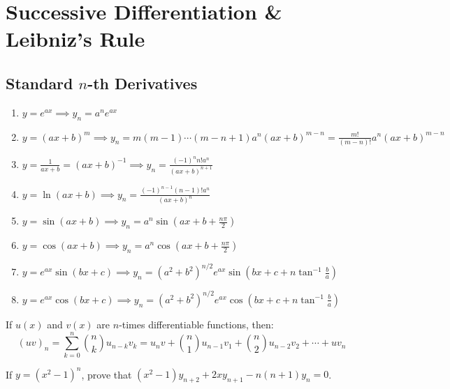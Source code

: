 \section{Successive Differentiation \& Leibniz's Rule}

\subsection{Standard $n$-th Derivatives}
\begin{enumerate}[leftmargin=1.5em]
    \item $y = e^{ax} \implies y_n = a^n e^{ax}$
    \item $y = (ax+b)^m \implies y_n = m(m-1)\cdots(m-n+1) a^n (ax+b)^{m-n} = \frac{m!}{(m-n)!} a^n (ax+b)^{m-n}$
    \item $y = \frac{1}{ax+b} = (ax+b)^{-1} \implies y_n = \frac{(-1)^n n! a^n}{(ax+b)^{n+1}}$
    \item $y = \ln(ax+b) \implies y_n = \frac{(-1)^{n-1} (n-1)! a^n}{(ax+b)^n}$
    \item $y = \sin(ax+b) \implies y_n = a^n \sin\left(ax+b + \frac{n\pi}{2}\right)$
    \item $y = \cos(ax+b) \implies y_n = a^n \cos\left(ax+b + \frac{n\pi}{2}\right)$
    \item $y = e^{ax} \sin(bx+c) \implies y_n = (a^2+b^2)^{n/2} e^{ax} \sin\left(bx+c + n\tan^{-1}\frac{b}{a}\right)$
    \item $y = e^{ax} \cos(bx+c) \implies y_n = (a^2+b^2)^{n/2} e^{ax} \cos\left(bx+c + n\tan^{-1}\frac{b}{a}\right)$
\end{enumerate}

\begin{theorem}
If $u(x)$ and $v(x)$ are $n$-times differentiable functions, then:
\begin{equation}
(uv)_n = \sum_{k=0}^n \binom{n}{k} u_{n-k} v_k = u_n v + \binom{n}{1} u_{n-1} v_1 + \binom{n}{2} u_{n-2} v_2 + \cdots + u v_n
\end{equation}
\end{theorem}

\begin{example}
If $y = (x^2 - 1)^n$, prove that $(x^2 - 1)y_{n+2} + 2x y_{n+1} - n(n+1)y_n = 0$.
\end{example}

